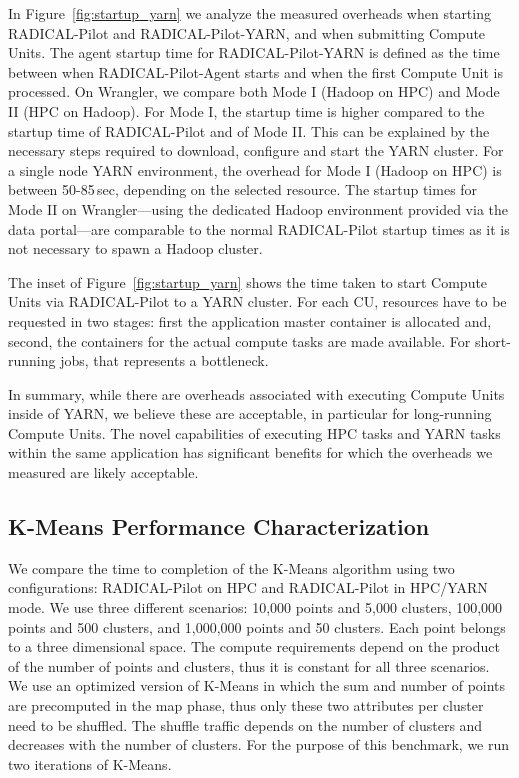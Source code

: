 In Figure~\ref{fig:startup_yarn} we analyze the measured overheads when starting
RADICAL-Pilot and RADICAL-Pilot-YARN, and when submitting Compute Units. The
agent startup time for RADICAL-Pilot-YARN is defined as the time between when
RADICAL-Pilot-Agent starts and when the first Compute Unit is processed. On
Wrangler, we compare both Mode I (Hadoop on HPC) and Mode II (HPC on Hadoop).
For Mode I, the startup time is higher compared to the startup time of
RADICAL-Pilot and of Mode II. This can be explained by the necessary steps
required to download, configure and start the YARN cluster. For a single node
YARN environment, the overhead for Mode I (Hadoop on HPC) is between 50-85\,sec,
depending on the selected resource. The startup times for Mode II on
Wrangler---using the dedicated Hadoop environment provided via the data
portal---are comparable to the normal RADICAL-Pilot startup times as it is not
necessary to spawn a Hadoop cluster.

The inset of Figure~\ref{fig:startup_yarn} shows the time taken to start Compute
Units via RADICAL-Pilot to a YARN cluster. For each CU, resources have to be
requested in two stages: first the application master container is allocated
and, second, the containers for the actual compute tasks are made available. For
short-running jobs, that represents a bottleneck.

In summary, while there are overheads associated with executing Compute Units
inside of YARN, we believe these are acceptable, in particular for long-running
Compute Units. The novel capabilities of executing HPC tasks and YARN tasks
within the same application has significant benefits for which the overheads we
measured are likely acceptable. 

\subsection{K-Means Performance Characterization}
\label{ssec:kmeans}

We compare the time to completion of the K-Means algorithm using two
configurations: RADICAL-Pilot on HPC and RADICAL-Pilot in HPC/YARN mode. We use
three different scenarios: 10,000 points and 5,000 clusters, 100,000 points and
500 clusters, and 1,000,000 points and 50 clusters. Each point belongs to a
three dimensional space. The compute requirements depend on the product of the
number of points and clusters, thus it is constant for all three scenarios. We
use an optimized version of K-Means in which the sum and number of points are
precomputed in the map phase, thus only these two attributes per cluster need to
be shuffled. The shuffle traffic depends on the number of clusters and decreases
with the number of clusters. For the purpose of this benchmark, we run two
iterations of K-Means.

